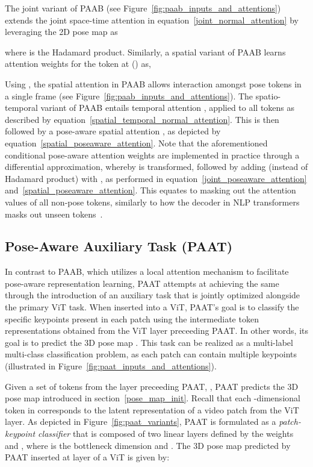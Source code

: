 \documentclass{article}
\begin{document}
The joint variant of PAAB (see Figure~\ref{fig:paab_inputs_and_attentions}) extends the joint space-time attention in equation~\ref{joint_normal_attention} by leveraging the 2D pose map   as
\vspace{-0.05in}

where  is the Hadamard product. Similarly, a spatial variant of PAAB learns attention weights  for the token at () as, 
\vspace{-0.05in}

Using , the spatial attention in PAAB allows interaction amongst pose tokens in a single frame (see Figure~\ref{fig:paab_inputs_and_attentions}). The spatio-temporal variant of PAAB entails temporal attention , applied to all tokens as described by equation~\ref{spatial_temporal_normal_attention}. This is then followed by a pose-aware spatial attention , as depicted by equation~\ref{spatial_poseaware_attention}.
Note that the aforementioned conditional pose-aware attention weights are implemented in practice through a differential approximation, whereby  is transformed, followed by adding (instead of Hadamard product) with , as performed in equation~\ref{joint_poseaware_attention} and~\ref{spatial_poseaware_attention}. This equates to masking out the attention values of all non-pose tokens, similarly to how the decoder in NLP transformers masks out unseen tokens~\cite{attention}.










\subsection{Pose-Aware Auxiliary Task (PAAT)}\label{sec:paat_introduction}
In contrast to PAAB, which utilizes a local attention mechanism to facilitate pose-aware representation learning, PAAT attempts at achieving the same through the introduction of an auxiliary task that is jointly optimized alongside the primary ViT task. 
When inserted into a ViT, PAAT's goal is to classify the specific keypoints present in each patch using the intermediate token representations obtained from the ViT layer preceeding PAAT. In other words, its goal is to predict the 3D pose map . This task can be realized as a multi-label multi-class classification problem, as each patch can contain multiple keypoints (illustrated in Figure~\ref{fig:paat_inputs_and_attentions}).

Given a set of tokens from the layer preceeding PAAT, , PAAT predicts the 3D pose map introduced in section~\ref{pose_map_init}. Recall that each -dimensional token in  corresponds to the latent representation of a video patch from the  ViT layer.
As depicted in Figure~\ref{fig:paat_variants}, PAAT is formulated as a \textit{patch-keypoint classifier} that is composed of two linear layers defined by the weights  and , where  is the bottleneck dimension and . The 3D pose map predicted by PAAT inserted at  layer of a ViT is given by:
\vspace{-0.05in}
\end{document}
